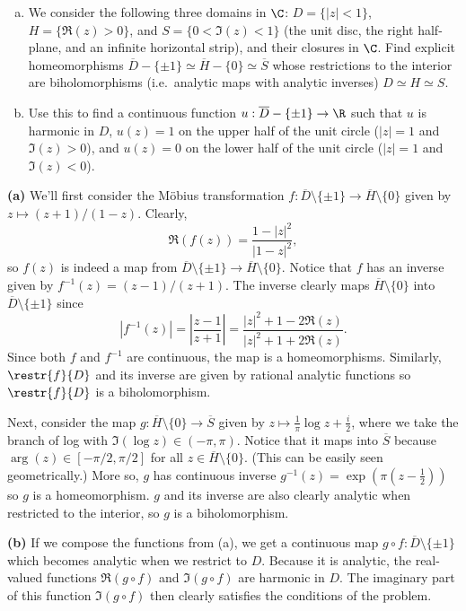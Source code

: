 \documentclass[11pt,letterpaper]{article}
\begin{document}
\begin{problem}\noindent
    \begin{enumerate}[(a)]
        \item We consider the following three domains in $\C$: $D=\{|z|<1\}$, $H=\{\Re(z)>0\}$, and $S=\{0<\Im(z)<1\}$ (the unit disc, the right half-plane, and an infinite horizontal strip), and their closures in $\C$. Find explicit homeomorphisms $\overline{D}-\{\pm 1\}\simeq \overline{H}-\{0\}\simeq \overline{S}$ whose restrictions to the interior are biholomorphisms (i.e.\ analytic maps with analytic inverses) $D\simeq H\simeq S$.
        \item Use this to find a continuous function $u:\overline{D}-\{\pm 1\}\to \R$ such that $u$ is harmonic in $D$, $u(z)=1$ on the upper half of the unit circle ($|z|=1$ and $\Im(z)>0$), and $u(z)=0$ on the lower half of the unit circle ($|z|=1$ and $\Im(z)<0$).
    \end{enumerate}
\end{problem}

\begin{solution}
    \textbf{(a)} We'll first consider the M\"obius transformation $f : \overline{D}\setminus\{\pm 1\} \to \overline{H}\setminus\{0\}$ given by $z \mapsto (z+1)/(1-z)$. Clearly, 
    \[
        \Re(f(z)) = \frac{1-|z|^2}{|1-z|^2},
    \] 
    so $f(z)$ is indeed a map from $\overline{D}\setminus\{\pm 1\} \to \overline{H}\setminus \{0\}$. Notice that $f$ has an inverse given by $f^{-1}(z)=(z-1)/(z+1)$. The inverse clearly maps $\overline{H}\setminus \{0\}$ into $\overline{D}\setminus \{\pm 1\}$ since 
    \[
        |f^{-1}(z)| = \left|\frac{z-1}{z+1}\right|=\frac{|z|^2+1-2\Re(z)}{|z|^2+1+2\Re(z)}
    .\] 
    Since both $f$ and $f^{-1}$ are continuous, the map is a homeomorphisms. Similarly, $\restr{f}{D}$ and its inverse are given by rational analytic functions so $\restr{f}{D}$ is a biholomorphism.

    Next, consider the map $g : \overline{H}\setminus \{0\} \to \overline{S}$ given by $z\mapsto \frac{1}{\pi}\log z + \frac{i}{2}$, where we take the branch of log with $\Im(\log z)\in (-\pi, \pi)$. Notice that it maps into $\overline{S}$ because $\arg(z)\in [-\pi / 2, \pi / 2]$ for all $z\in \overline{H}\setminus\{0\}$. (This can be easily seen geometrically.) More so, $g$ has continuous inverse $g^{-1}(z)=\exp(\pi(z-\frac12))$ so $g$ is a homeomorphism. $g$ and its inverse are also clearly analytic when restricted to the interior, so $g$ is a biholomorphism.

    \textbf{(b)} If we compose the functions from (a), we get a continuous map $g\circ f : \overline{D}\setminus\{\pm 1\}$ which becomes analytic when we restrict to $D$. Because it is analytic, the real-valued functions $\Re(g\circ f)$ and $\Im(g\circ f)$ are harmonic in $D$. The imaginary part of this function $\Im(g\circ f)$ then clearly satisfies the conditions of the problem.
\end{solution}
\end{document}
